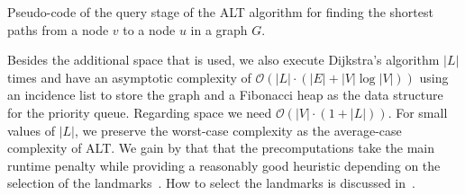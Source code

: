             \begin{algorithm}[htp]
                \hrulealg
            \caption{Pseudo-code of the query stage of the ALT algorithm for finding the shortest paths from a node $v$ to a node $u$ in a graph $G$.}\label{alt-query}
            \end{algorithm}
            
            Besides the additional space that is used, we also execute Dijkstra's algorithm $|L|$ times and have an asymptotic complexity of $\mathcal{O}(|L| \cdot (|E| + |V| \log |V|))$ using an incidence list to store the graph and a Fibonacci heap as the data structure for the priority queue. 
            Regarding space we need $\mathcal{O}(|V| \cdot (1 + |L|))$. 
            For small values of $|L|$, we preserve the worst-case complexity as the average-case complexity of ALT.
            We gain by that that the precomputations take the main runtime penalty while providing a reasonably good heuristic depending on the selection of the landmarks~\autocite{goldberg2005computing}. 
            How to select the landmarks is discussed in~\autocite{Goldberg2005ComputingPS}.
            
